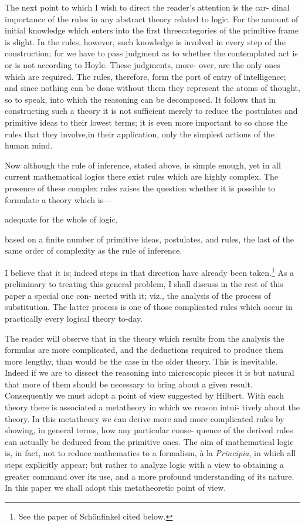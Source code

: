 \documentclass[10pt, twoside]{extarticle}
\theoremstyle{breaktheorem}
\theoremstyle{mylemma}
\theoremstyle{mydefinition}
\theoremstyle{mycorollary}
\begin{document}
The next point to which I wish to direct the reader's attention is the car-
dinal importance of the rules in any abstract theory related to logic. For the
amount of initial knowledge which enters into the first threecategories of the
primitive frame is slight. In the rules, however, such knowledge is involved
in every step of the construction; for we have to pass judgment as to whether
the contemplated act is or is not according to Hoyle. These judgments, more-
over, are the only ones which are required. The rules, therefore, form the
port of entry of intelligence; and since nothing can be done without them
they represent the atoms of thought, so to speak, into which the reasoning
can be decomposed. It follows that in constructing such a theory it is not
sufficient merely to reduce the postulates and primitive ideas to their lowest
terms; it is even more important to so chose the rules that they involve,in
their application, only the simplest actions of the human mind.

Now although the rule of inference, stated above, is simple enough, yet in
all current mathematical logics there exist rules which are highly complex.
The presence of these complex rules raises the question whether it is possible
to formulate a theory which is---\begin{enumerate*}[label=\arabic*)] \item adequate for the whole of logic, \item based
on a finite number of primitive ideas, postulates, and rules, the last of the
same order of complexity as the rule of inference. \end{enumerate*} I believe that it is; indeed
steps in that direction have already been taken.\footnote{See the paper of Schönfinkel cited below.} As a preliminary to treating
this general problem, I shall discuss in the rest of this paper a special one con-
nected with it; viz., the analysis of the process of substitution. The latter
process is one of those complicated rules which occur in practically every
logical theory to-day.

The reader will observe that in the theory which results from the analysis
the formulas are more complicated, and the deductions required to produce
them more lengthy, than would be the case in the older theory. This is
inevitable. Indeed if we are to dissect the reasoning into microscopic pieces
it is but natural that more of them should be necessary to bring about a given
result. Consequently we must adopt a point of view suggested by Hilbert.
With each theory there is associated a metatheory in which we reason intui-
tively about the theory. In this metatheory we can derive more and more
complicated rules by showing, in general terms, how any particular conse-
quence of the derived rules can actually be deduced from the primitive ones.
The aim of mathematical logic is, in fact, not to reduce mathematics to a
formalism, à la \textit{Principia}, in which all steps explicitly appear; but rather to
analyze logic with a view to obtaining a greater command over its use, and a
more profound understanding of its nature. In this paper we shall adopt
this metatheoretic point of view.
\end{document}
